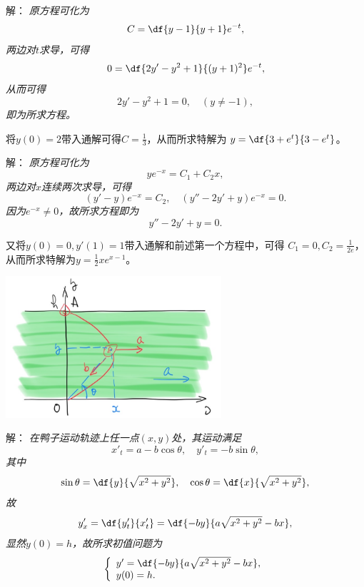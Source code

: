 \begin{frame}
	\linespread{1.5}
	
	
	\small 解：\it
	原方程可化为
	$$C=\df{y-1}{y+1}e^{-t},$$
	两边对$t$求导，可得
	$$0=\df{2y'-y^2+1}{(y+1)^2}e^{-t},$$
	从而可得
	$$2y'-y^2+1=0,\quad(y\ne-1),$$
	即为所求方程。
	
	将$y(0)=2$带入通解可得$C=\frac13$，从而所求特解为
	$y=\df{3+e^t}{3-e^t}$。
\end{frame}

\begin{frame}
	\linespread{1.5}
	
	
	\small 解：\it
	原方程可化为
	$$ye^{-x}=C_1+C_2x,$$
	两边对$x$连续两次求导，可得
	$$(y'-y)e^{-x}=C_2,\quad
	(y''-2y'+y)e^{-x}=0.$$
	因为$e^{-x}\ne0$，故所求方程即为
	$$y''-2y'+y=0.$$
	
	又将$y(0)=0,y'(1)=1$带入通解和前述第一个方程中，可得
	$C_1=0,C_2=\frac1{2e}$，从而所求特解为$y=\frac12xe^{x-1}$。
	\fin
\end{frame}

\begin{frame}
	\linespread{1.5}
	

	\begin{center}
		\includegraphics[width=0.6\textwidth]{./images/ch7/duck.jpg}
	\end{center}
\end{frame}

\begin{frame}
	\linespread{1.5}	
	\small 解：\it
	在鸭子运动轨迹上任一点$(x,y)$处，其运动满足
	$$x'_t=a-b\cos\theta,\quad y'_t=-b\sin\theta,$$
	其中
	$$\sin\theta=\df{y}{\sqrt{x^2+y^2}},\quad
	\cos\theta=\df{x}{\sqrt{x^2+y^2}},$$
	故
	$$y'_x=\df{y'_t}{x'_t}=\df{-by}{a\sqrt{x^2+y^2}-bx},$$
	显然$y(0)=h$，故所求初值问题为
	$$
		\left\{\begin{array}{l}
			y'=\df{-by}{a\sqrt{x^2+y^2}-bx},\\
			y(0)=h.
		\end{array}\right.
	$$
	\fin
\end{frame}

